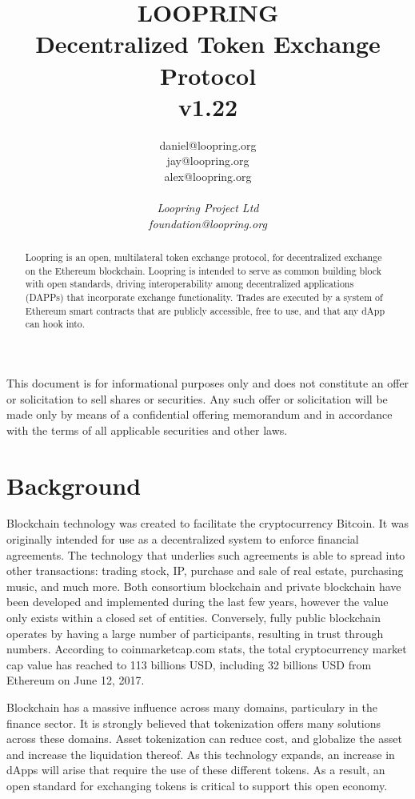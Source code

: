 \documentclass[UTF8,nofonts]{article}
\title{\textbf{LOOPRING}\\\textbf{Decentralized Token Exchange Protocol}\\v1.22}
\author{
  daniel@loopring.org\\
  jay@loopring.org\\
  alex@loopring.org\\ 
  \\
  \textit{Loopring Project Ltd}\\
  \textit{foundation@loopring.org}\\
 }
\begin{document}
\maketitle
This document is for informational purposes only and does not constitute an offer or solicitation to sell shares or securities. Any such offer or solicitation will be made only by means of a confidential offering memorandum and in accordance with the terms of all applicable securities and other laws.



\begin{abstract}
Loopring is an open, multilateral token exchange protocol, for decentralized exchange on the Ethereum blockchain. Loopring is intended to serve as common building block with open standards, driving interoperability among decentralized applications (DAPPs) that incorporate exchange functionality. Trades are executed by a system of Ethereum smart contracts that are publicly accessible, free to use, and that any dApp can hook into.
\end{abstract}

\newpage

\tableofcontents
\newpage

\section{Background\label{sec: background}}

Blockchain\cite{staff2016blockchains}\cite{swan2015blockchain} technology was created to facilitate the cryptocurrency Bitcoin\cite{nakamoto2008Bitcoin}. It was originally intended for use as a decentralized system to enforce financial agreements\cite{lamport1982byzantine}\cite{christidis2016blockchains}. The technology that underlies such agreements is able to spread into other transactions: trading stock, IP, purchase and sale of real estate, purchasing music, and much more. Both consortium blockchain and private blockchain have been developed and implemented during the last few years, however the value only exists within a closed set of entities. Conversely, fully public blockchain operates by having a large number of participants, resulting in trust through numbers. According to coinmarketcap.com stats, the total cryptocurrency market cap value has reached to 113 billions USD,  including 32 billions USD from Ethereum\cite{wood2014ethereum} on June 12, 2017.

Blockchain has a massive influence across many domains,  particulary in the finance sector. It is strongly believed that tokenization\cite{liu2016medical}\cite{christidis2016blockchains}\cite{swan2015blockchain} offers many solutions across these domains. Asset tokenization can reduce cost, and globalize the asset and increase the liquidation thereof. As this technology expands, an increase in dApps will arise that require the use of these different tokens. As a result, an open standard for exchanging tokens is critical to support this open economy.
\end{document}
